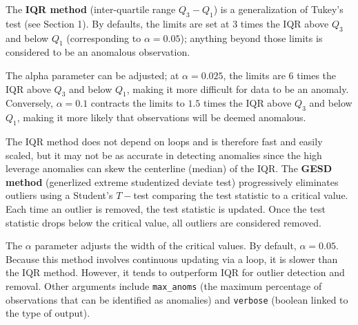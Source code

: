 \newl The \textbf{IQR method} (inter-quartile range $Q_3-Q_1$) is a generalization of Tukey's test (see Section 1). By defaults, the limits are set at 3 times the IQR above $Q_3$ and below $Q_1$ (corresponding to $\alpha=0.05$); anything beyond those limits is considered to be an anomalous observation. \par The alpha parameter can be adjusted; at $\alpha = 0.025$, the limits are 6 times the IQR above $Q_3$ and below $Q_1$, making it more difficult for data to be an anomaly. Conversely, $\alpha = 0.1$ contracts the limits to $1.5$ times the IQR above $Q_3$ and below $Q_1$, making it more likely that observations will be deemed anomalous. \par The IQR method does not depend on loops and is therefore fast and easily scaled, but it may not be as accurate in detecting anomalies since the high leverage anomalies can skew the centerline (median) of the IQR. \newl The \textbf{GESD method} (generlized extreme studentized deviate test) progressively eliminates outliers using a Student's $T-$test comparing the test statistic to a critical value. Each time an outlier is removed, the test statistic is updated. Once the test statistic drops below the critical value, all outliers are considered removed. \par The $\alpha$ parameter adjusts the width of the critical values. By default, $\alpha = 0.05$. Because this method involves continuous updating via a loop, it is slower than the IQR method. However, it tends to outperform IQR for outlier detection and removal. \newl Other arguments include \verb|max_anoms| (the maximum percentage of observations that can be identified as anomalies) and \verb|verbose| (boolean linked to the type of output). 
